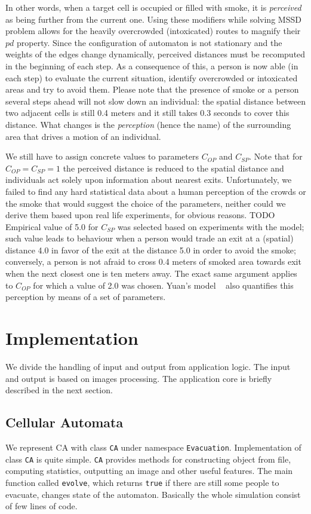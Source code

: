 In other words, when a target cell is occupied or filled with smoke, it is
\emph{perceived} as being further from the current one.
Using these modifiers while solving MSSD problem allows for the heavily 
overcrowded (intoxicated) routes to magnify their $pd$ property.
Since the configuration of automaton is not stationary and the weights of the
edges change dynamically, perceived distances must be recomputed in the
beginning of each step.
As a consequence of this, a person is now able (in each step) to evaluate the 
current situation, identify overcrowded or intoxicated areas and try to avoid
them. 
Please note that the presence of smoke or a person several steps ahead will not
slow down an individual: the spatial distance between two adjacent cells is
still 0.4 meters and it still takes 0.3 seconds to cover this distance.
What changes is the \emph{perception} (hence the name) of the surrounding area
that drives a motion of an individual.

We still have to assign concrete values to parameters $C_{OP}$ and $C_{SP}$.
Note that for $C_{OP} = C_{SP} = 1$ the perceived distance is reduced to the
spatial distance and individuals act solely upon information about nearest exits. 
Unfortunately, we failed to find any hard statistical data about a human
perception of the crowds or the smoke that would suggest the choice of the
parameters, neither could we derive them based upon real life experiments, for
obvious reasons. 
TODO Empirical value of 5.0 for $C_{SP}$ was selected based on experiments with the 
model; such value leads to behaviour when a person would trade an exit at a
(spatial) distance 4.0 in favor of the exit at the distance 5.0 in order to avoid 
the smoke; conversely, a person is not afraid to cross 0.4 meters of smoked area 
towards exit when the next closest one is ten meters away.
The exact same argument applies to $C_{OP}$ for which a value of 2.0 was chosen.
Yuan's model ~\cite{Yuan} also quantifies this perception by means of a set
of parameters.

\section{Implementation}
We divide the handling of input and output from application logic. The
input and output is based on images processing. The application core is briefly
described in the next section.

\subsection{Cellular Automata}
We represent CA with class \texttt{CA} under namespace \texttt{Evacuation}.
Implementation of class \texttt{CA} is quite simple. \texttt{CA} provides
methods for constructing object from file, computing statistics, outputting an
image and other useful features. The main function called \texttt{evolve},
which returns \texttt{true} if there are still some people to evacuate, changes
state of the automaton. Basically the whole simulation consist of few lines of
code.


